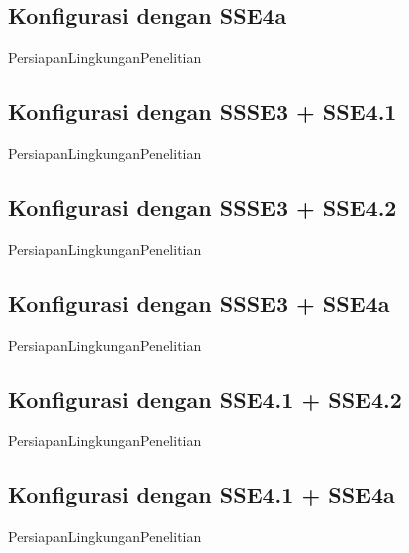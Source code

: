 \subsection{Konfigurasi dengan SSE4a}
PersiapanLingkunganPenelitian

\subsection{Konfigurasi dengan SSSE3 + SSE4.1 }
PersiapanLingkunganPenelitian

\subsection{Konfigurasi dengan SSSE3 + SSE4.2}
PersiapanLingkunganPenelitian

\subsection{Konfigurasi dengan SSSE3 + SSE4a}
PersiapanLingkunganPenelitian

\subsection{Konfigurasi dengan SSE4.1 + SSE4.2}
PersiapanLingkunganPenelitian

\subsection{Konfigurasi dengan SSE4.1 + SSE4a}
PersiapanLingkunganPenelitian


